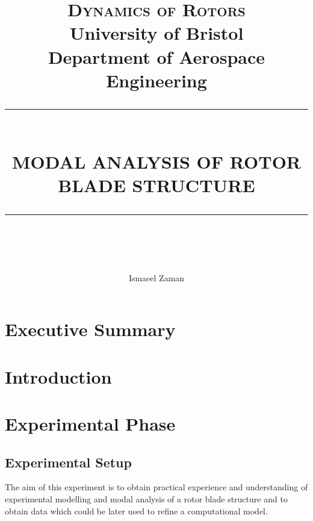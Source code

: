 \documentclass[11pt]{article}
\newcommand{\HRule}[1]{\rule{\linewidth}{#1}}
\begin{document}
\title{ \normalsize \textsc{Dynamics of Rotors}
		\\ 		University of Bristol \\
		Department of Aerospace Engineering\\ [0.5cm]
		\HRule{0.5pt} \\
		\LARGE \textbf{\uppercase{Modal Analysis of Rotor Blade Structure}}
		\HRule{2pt} \\ [0.5cm]
		\normalsize}
\author{
		Ismaeel Zaman  \\
 }
\maketitle



\section{Executive Summary}
\section{Introduction}

\newpage

\section{Experimental Phase}
\subsection{Experimental Setup}
The aim of this experiment is to obtain practical experience and understanding of experimental modelling and modal analysis of a rotor blade structure and to obtain data which could be later used to refine a computational model.\\
\end{document}
